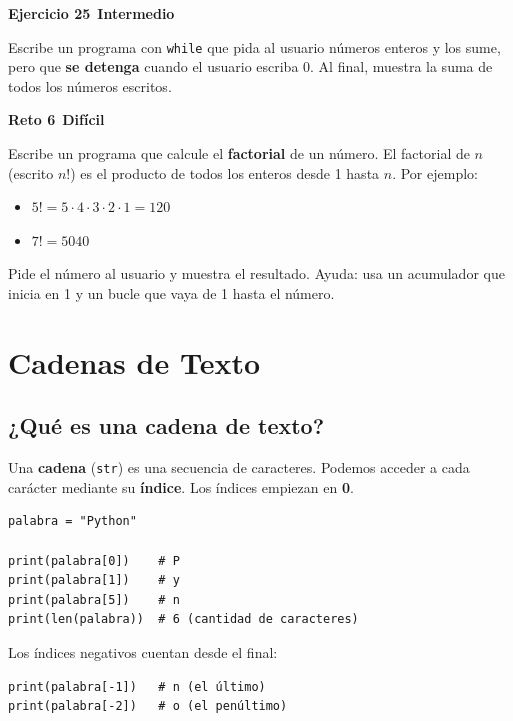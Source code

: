 \documentclass[11pt,a4paper]{article}
\newcommand{\intermedio}{\textcolor{naranjaVivo}{\faIcon{circle}\,\textbf{Intermedio}}}
\newcommand{\dificil}{\textcolor{rojoAlerta}{\faIcon{circle}\,\textbf{Difícil}}}
\begin{document}
\begin{cajaEjercicio}
\textbf{Ejercicio 25} \intermedio

Escribe un programa con \texttt{while} que pida al usuario números enteros y los sume, pero que \textbf{se detenga} cuando el usuario escriba 0. Al final, muestra la suma de todos los números escritos.
\end{cajaEjercicio}

\begin{cajaReto}
\textbf{Reto 6} \dificil

Escribe un programa que calcule el \textbf{factorial} de un número. El factorial de $n$ (escrito $n!$) es el producto de todos los enteros desde 1 hasta $n$. Por ejemplo:
\begin{itemize}
    \item $5! = 5 \cdot 4 \cdot 3 \cdot 2 \cdot 1 = 120$
    \item $7! = 5040$
\end{itemize}
Pide el número al usuario y muestra el resultado. Ayuda: usa un acumulador que inicia en 1 y un bucle que vaya de 1 hasta el número.
\end{cajaReto}

\section{Cadenas de Texto}

\subsection{¿Qué es una cadena de texto?}

Una \textbf{cadena} (\texttt{str}) es una secuencia de caracteres. Podemos acceder a cada carácter mediante su \textbf{índice}. Los índices empiezan en \textbf{0}.

\begin{cajaEjemplo}
\begin{lstlisting}[style=pythonStyle, caption={Acceder a caracteres}]
palabra = "Python"

print(palabra[0])    # P
print(palabra[1])    # y
print(palabra[5])    # n
print(len(palabra))  # 6 (cantidad de caracteres)
\end{lstlisting}

Los índices negativos cuentan desde el final:
\begin{lstlisting}[style=pythonStyle]
print(palabra[-1])   # n (el último)
print(palabra[-2])   # o (el penúltimo)
\end{lstlisting}
\end{cajaEjemplo}
\end{document}
